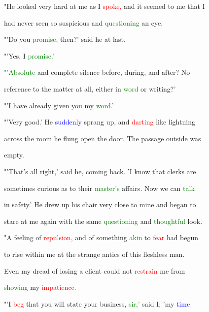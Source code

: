  "He looked very hard at me as I \textcolor{red}{spoke,} and it seemed to me that I

 had never seen so \textcolor{BurntOrange}{suspicious} and \textcolor{green}{questioning} an eye.



 "'Do you \textcolor{green}{promise,} then?' said he at last.



 "'Yes, I \textcolor{green}{promise.'}



 \textcolor{green}{"'Absolute} and complete silence before, during, and after? No

 reference to the matter at all, either in \textcolor{green}{word} or writing?'



 "'I have already given you my \textcolor{green}{word.'}



 "'Very \textcolor{BurntOrange}{good.'} He \textcolor{blue}{suddenly} sprang up, and \textcolor{red}{darting} like \textcolor{BurntOrange}{lightning}

 across the room he flung open the door. The passage outside was

 empty.



 "'That's all right,' said he, coming back. 'I know that clerks are

 sometimes curious as to their \textcolor{green}{master's} affairs. Now we can \textcolor{green}{talk}

 in safety.' He drew up his chair very close to mine and began to

 stare at me again with the same \textcolor{green}{questioning} and \textcolor{green}{thoughtful} look.



 "A feeling of \textcolor{red}{repulsion,} and of something \textcolor{green}{akin} to \textcolor{red}{fear} had begun

 to rise within me at the strange antics of this fleshless man.

 Even my \textcolor{BurntOrange}{dread} of \textcolor{BurntOrange}{losing} a client could not \textcolor{red}{restrain} me from

 \textcolor{green}{showing} my \textcolor{red}{impatience.}



 "'I \textcolor{red}{beg} that you will state your business, \textcolor{green}{sir,'} said I; 'my \textcolor{blue}{time}

